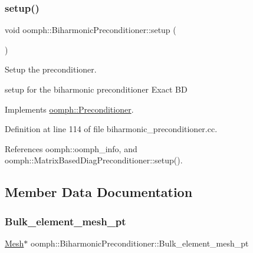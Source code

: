 \mbox{\label{classoomph_1_1BiharmonicPreconditioner_a8f4c9b8a387e27191659e528f0ff82a1}} 
\subsubsection{\texorpdfstring{setup()}{setup()}}
{\footnotesize\ttfamily void oomph\+::\+Biharmonic\+Preconditioner\+::setup (\begin{DoxyParamCaption}{ }\end{DoxyParamCaption})\hspace{0.3cm}{\ttfamily [virtual]}}



Setup the preconditioner. 

setup for the biharmonic preconditioner Exact BD 

Implements \hyperlink{classoomph_1_1Preconditioner_af4886f4efe510e5c9b0eb19422943588}{oomph\+::\+Preconditioner}.



Definition at line 114 of file biharmonic\+\_\+preconditioner.\+cc.



References oomph\+::oomph\+\_\+info, and oomph\+::\+Matrix\+Based\+Diag\+Preconditioner\+::setup().



\subsection{Member Data Documentation}
\mbox{\label{classoomph_1_1BiharmonicPreconditioner_abc9f6d896b7fec2dee492554c1f64e15}} 
\subsubsection{\texorpdfstring{Bulk\+\_\+element\+\_\+mesh\+\_\+pt}{Bulk\_element\_mesh\_pt}}
{\footnotesize\ttfamily \hyperlink{classoomph_1_1Mesh}{Mesh}$\ast$ oomph\+::\+Biharmonic\+Preconditioner\+::\+Bulk\+\_\+element\+\_\+mesh\+\_\+pt\hspace{0.3cm}{\ttfamily [private]}}



